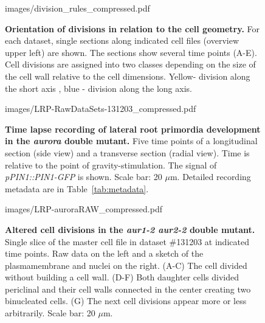 \documentclass[11pt,a4paper, final]{article}
\begin{document}
%
\begin{figure}[htbp]
\centering
	\begin{overpic}[width=1.\linewidth]{images/division_rules_compressed.pdf}
	\end{overpic}
\caption[Orientation of divisions in relation to the cell geometry.]
{{\bf Orientation of divisions in relation to the cell geometry.} For each dataset, single sections along indicated cell files (overview upper left) are shown. The sections show several time points (A-E). Cell divisions are assigned into two classes depending on the size of the cell wall relative to the cell dimensions. Yellow- division along the short axis , blue - division along the long axis. }
	\label{fig:divrules}
\end{figure}
%
%
%
%
\begin{figure}[htbp]
\centering
	\begin{overpic}[width=1.\linewidth]{images/LRP-RawDataSets-131203_compressed.pdf}
	\end{overpic}
\caption[ Time lapse recording of lateral root primordia development in the \emph{aurora} double mutant.]
{{\bf Time lapse recording of lateral root primordia development in the \emph{aurora} double mutant.} Five time points of a longitudinal section (side view) and a transverse section (radial view). Time is relative to the point of gravity-stimulation. The signal of \emph{pPIN1::PIN1-GFP }is shown. Scale bar: 20 $\mu$m. Detailed recording metadata are in Table~\ref{tab:metadata}.}
\label{fig:auroraRaw}
\end{figure}
\clearpage
%
\begin{figure}[htbp]
\centering
	\begin{overpic}[width=0.7\linewidth]{images/LRP-auroraRAW_compressed.pdf}
	\end{overpic}
\caption[Altered cell divisions in the \emph{aur1-2 aur2-2} double mutant. ]
{{\bf Altered cell divisions in the \emph{aur1-2 aur2-2} double mutant. } Single slice of the master cell file in dataset \#131203 at indicated time points. Raw data on the left and a sketch of the plasmamembrane and nuclei on the right. (A-C) The cell divided without building a cell wall. (D-F) Both daughter cells divided periclinal and their cell walls connected in the center creating two binucleated cells. (G) The next cell divisions appear more or less arbitrarily. Scale bar: 20 $\mu$m.}
	\label{fig:aurora}
\end{figure}
\end{document}
